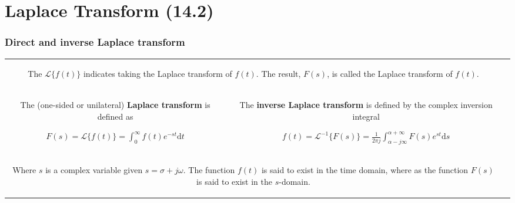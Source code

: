 \documentclass[aspectratio=169]{beamer}
\begin{document}
\section{Laplace Transform (14.2)}
\begin{frame}[fragile]
	\frametitle{Direct and inverse Laplace transform }
		\begin{tabular}{cc}
		\begin{columns}
		\begin{column}{1\textwidth}  %

	The $\mathscr{L}\{f(t)\}$  indicates taking the Laplace transform of $f(t)$. The result, $F(s)$,
is called the Laplace transform of $f(t)$.  \newline	

				\end{column}
				\end{columns}\\
	\begin{columns}
	\begin{column}{.5\textwidth}  %
The (one-sided or unilateral) \textbf{Laplace transform} is defined as
\begin{center}		$F(s)=\mathscr{L}\{f(t)\}=\int_{0}^{\infty}\!f(t)e^{-st}\mathrm{d}t$ \end{center}

 
				\end{column}
\begin{column}{.5\textwidth}  %
The \textbf{inverse Laplace transform} is defined by the complex inversion integral
\begin{center}		$f(t)=\mathscr{L}^{-1}\{F(s)\}=\frac{1}{2 \pi j}\int_{\alpha-j\infty}^{\alpha+\infty}\!F(s)e^{st}\mathrm{d}s$ \end{center}
 
 
				\end{column}				
	\end{columns}\\	
		\begin{columns}
		\begin{column}{1\textwidth}  %
\newline \newline	Where $s$ is a complex variable given $s=\sigma+j\omega$.  		The function $f(t)$ is said to exist in the time domain,
where as the function $F(s)$ is said to exist in the  $s$-domain.

				\end{column}
				\end{columns}\\				
			
				
				
				
	\end{tabular}		
\end{frame}
\end{document}
